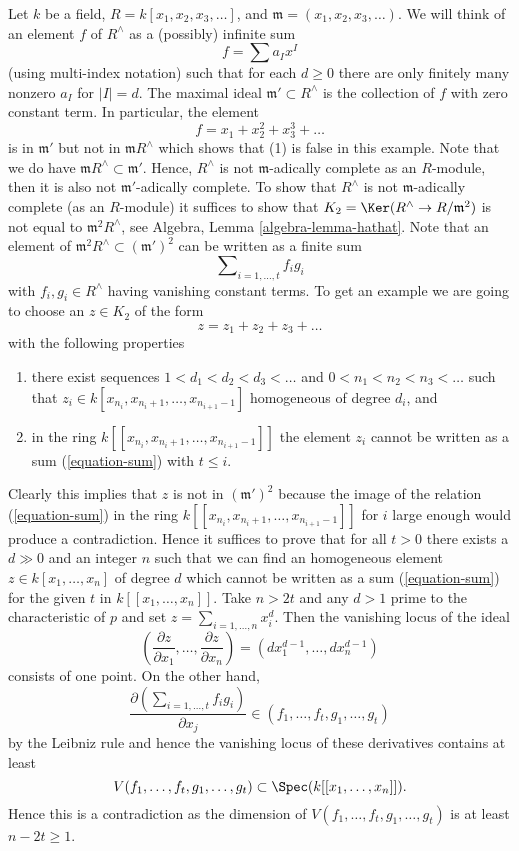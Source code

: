 \medskip\noindent
Let $k$ be a field, $R = k[x_1, x_2, x_3, \ldots]$, and
$\mathfrak m = (x_1, x_2, x_3, \ldots)$.
We will think of an element $f$ of $R^\wedge$ as a (possibly) infinite sum
$$
f = \sum a_I x^I
$$
(using multi-index notation) such that for each $d \geq 0$ there
are only finitely many nonzero $a_I$ for $|I| = d$. The maximal
ideal $\mathfrak m' \subset R^\wedge$ is the collection of $f$ with
zero constant term. In particular, the element
$$
f = x_1 + x_2^2 + x_3^3 + \ldots
$$
is in $\mathfrak m'$ but not in $\mathfrak m R^\wedge$ which
shows that (1) is false in this example. Note that we do have
$\mathfrak m R^\wedge \subset \mathfrak m'$. Hence, $R^\wedge$
is not $\mathfrak m$-adically complete as an $R$-module, then it is also not
$\mathfrak m'$-adically complete. To show that $R^\wedge$ is not
$\mathfrak m$-adically complete (as an $R$-module)
it suffices to show that $K_2 = \Ker(R^\wedge \to R/\mathfrak m^2)$
is not equal to $\mathfrak m^2R^\wedge$, see
Algebra, Lemma \ref{algebra-lemma-hathat}.
Note that an element of $\mathfrak m^2R^\wedge \subset (\mathfrak m')^2$
can be written as a finite sum
\begin{equation}
\label{equation-sum}
\sum\nolimits_{i = 1, \ldots, t} f_i g_i
\end{equation}
with $f_i, g_i \in R^\wedge$ having vanishing constant terms.
To get an example we are going to choose an $z \in K_2$
of the form
$$
z = z_1 + z_2 + z_3 + \ldots
$$
with the following properties
\begin{enumerate}
\item there exist sequences $1 < d_1 < d_2 < d_3 < \ldots $ and
$0 < n_1 < n_2 < n_3 < \ldots$ such that
$z_i \in k[x_{n_i}, x_{n_i + 1}, \ldots, x_{n_{i + 1} - 1}]$
homogeneous of degree $d_i$, and
\item in the ring $k[[x_{n_i}, x_{n_i + 1}, \ldots, x_{n_{i + 1} - 1}]]$
the element $z_i$ cannot be written as a sum (\ref{equation-sum})
with $t \leq i$.
\end{enumerate}
Clearly this implies that $z$ is not in $(\mathfrak m')^2$
because the image of the relation (\ref{equation-sum}) in the
ring $k[[x_{n_i}, x_{n_i + 1}, \ldots, x_{n_{i + 1} - 1}]]$
for $i$ large enough would produce a contradiction. Hence it suffices
to prove that for all $t > 0$ there exists a $d \gg 0$ and an integer
$n$ such that we can find an homogeneous element
$z \in k[x_1, \ldots, x_n]$ of degree $d$ which cannot be written as
a sum (\ref{equation-sum}) for the given $t$ in $k[[x_1, \ldots, x_n]]$.
Take $n > 2t$ and any $d > 1$ prime to the characteristic of $p$ and
set $z = \sum_{i = 1, \ldots, n} x_i^d$. Then the vanishing locus
of the ideal
$$
(\frac{\partial z}{\partial x_1}, \ldots, \frac{\partial z}{\partial x_n})
=
(dx_1^{d - 1}, \ldots, dx_n^{d - 1})
$$
consists of one point. On the other hand,
$$
\frac{\partial ( \sum\nolimits_{i = 1, \ldots, t} f_i g_i ) }{\partial x_j}
\in (f_1, \ldots, f_t, g_1, \ldots, g_t)
$$
by the Leibniz rule and hence the vanishing locus of these derivatives
contains at least
$$
V(f_1, \ldots, f_t, g_1, \ldots, g_t) \subset
\Spec(k[[x_1, \ldots, x_n]]).
$$
Hence this is a contradiction as the dimension of
$V(f_1, \ldots, f_t, g_1, \ldots, g_t)$ is at least $n - 2t \geq 1$.

